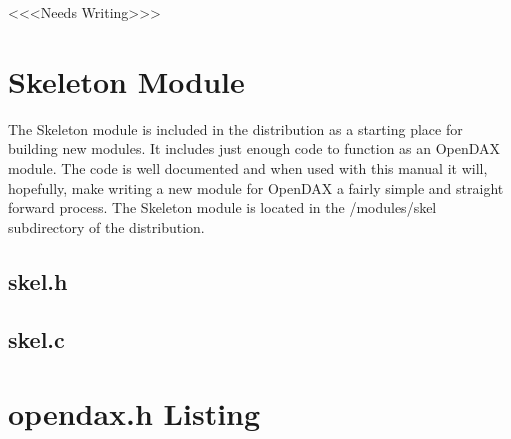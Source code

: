 <<<Needs Writing>>>

\appendix



\chapter{Skeleton Module}
The Skeleton module is included in the distribution as a starting place for building new modules.  It includes just enough code to function as an OpenDAX module.  The code is well documented and when used with this manual it will, hopefully, make writing a new module for OpenDAX a fairly simple and straight forward process.  The Skeleton module is located in the /modules/skel subdirectory of the distribution.

\section{skel.h}
\begin{tiny}

\end{tiny}
\section{skel.c}
\begin{tiny}

\end{tiny}


\chapter{opendax.h Listing}
\begin{tiny}

\end{tiny}

%

\printindex

